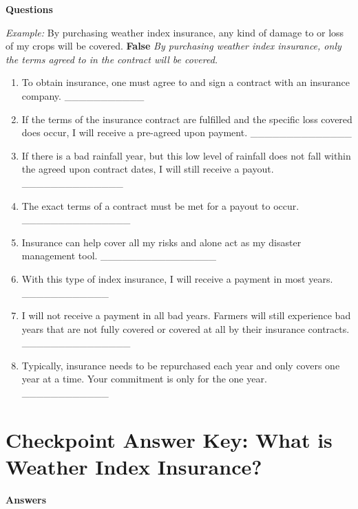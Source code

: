\documentclass[letterpaper,10pt,english]{sphinxmanual}
\begin{document}
\textbf{Questions}

\emph{Example:} By purchasing weather index insurance, any kind of damage to or loss of my crops will be covered. \textbf{False} \emph{By purchasing weather index insurance, only the terms agreed to in the contract will be covered.}
\begin{enumerate}
\item {} 
To obtain insurance, one must agree to and sign a contract with an insurance company. \_\_\_\_\_\_\_\_\_\_\_

\item {} 
If the terms of the insurance contract are fulfilled and the specific loss covered does occur, I will receive a pre-agreed upon payment. \_\_\_\_\_\_\_\_\_\_\_\_\_\_

\item {} 
If there is a bad rainfall year, but this low level of rainfall does not fall within the agreed upon contract dates, I will still receive a payout. \_\_\_\_\_\_\_\_\_\_\_\_\_\_

\item {} 
The exact terms of a contract must be met for a payout to occur. \_\_\_\_\_\_\_\_\_\_\_\_\_\_\_

\item {} 
Insurance can help cover all my risks and alone act as my disaster management tool. \_\_\_\_\_\_\_\_\_\_\_\_\_\_\_\_

\item {} 
With this type of index insurance, I will receive a payment in most years. \_\_\_\_\_\_\_\_\_\_\_\_

\item {} 
I will not receive a payment in all bad years. Farmers will still experience bad years that are not fully covered or covered at all by their insurance contracts. \_\_\_\_\_\_\_\_\_\_\_\_\_\_\_

\item {} 
Typically, insurance needs to be repurchased each year and only covers one year at a time. Your commitment is only for the one year. \_\_\_\_\_\_\_\_\_\_\_\_

\end{enumerate}


\section{Checkpoint Answer Key: What is Weather Index Insurance?}
\label{whatisindexinsurance/weather/weatherindexinsuranceanskey_en:checkpoint-answer-key-what-is-weather-index-insurance}\label{whatisindexinsurance/weather/weatherindexinsuranceanskey_en::doc}
\textbf{Answers}
\end{document}
